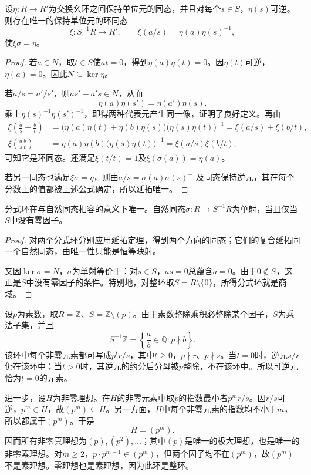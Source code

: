 \begin{theorem}\label{p2:localization-universal}
设$\eta:R\to R'$为交换幺环之间保持单位元的同态，并且对每个$s\in S$，$\eta(s)$可逆。则存在唯一的保持单位元的环同态
\[
\xi:S^{-1}R\to R',\qquad
\xi(a/s)=\eta(a)\eta(s)^{-1},
\]
使$\xi\sigma=\eta$。
\end{theorem}
\begin{proof}
若$a\in N$，取$t\in S$使$at=0$，得到$\eta(a)\eta(t)=0$。因$\eta(t)$可逆，$\eta(a)=0$。因此$N\subseteq\ker\eta$。

若$a/s=a'/s'$，则$as'-a's\in N$，从而
\[
\eta(a)\eta(s')=\eta(a')\eta(s).
\]
乘上$\eta(s)^{-1}\eta(s')^{-1}$，即得两种代表元产生同一像，证明了良好定义。再由
\begin{align*}
\xi\left(\frac as+\frac bt\right)
&=\bigl(\eta(a)\eta(t)+\eta(b)\eta(s)\bigr)
  \bigl(\eta(s)\eta(t)\bigr)^{-1}
=\xi(a/s)+\xi(b/t),\\
\xi\left(\frac as\frac bt\right)
&=\eta(a)\eta(b)\bigl(\eta(s)\eta(t)\bigr)^{-1}
=\xi(a/s)\xi(b/t),
\end{align*}
可知它是环同态。还满足$\xi(t/t)=1$及$\xi(\sigma(a))=\eta(a)$。

若另一同态也满足$\xi\sigma=\eta$，则由$a/s=\sigma(a)\sigma(s)^{-1}$及同态保持逆元，其在每个分数上的值都被上述公式确定，所以延拓唯一。
\end{proof}

\begin{corollary}
分式环在与自然同态相容的意义下唯一。自然同态$\sigma:R\to S^{-1}R$为单射，当且仅当$S$中没有零因子。
\end{corollary}
\begin{proof}
对两个分式环分别应用延拓定理，得到两个方向的同态；它们的复合延拓同一个自然同态，由唯一性只能是恒等映射。

又因$\ker\sigma=N$，$\sigma$为单射等价于：对$s\in S$，$as=0$总蕴含$a=0$。由于$0\notin S$，这正是$S$中没有零因子的条件。特别地，对整环取$S=R\setminus\{0\}$，所得分式环就是商域。
\end{proof}

\begin{example}
设$p$为素数，取$R=\mathbb Z$、$S=\mathbb Z\setminus(p)$。由于素数整除乘积必整除某个因子，$S$为乘法子集，并且
\[
S^{-1}\mathbb Z
=\left\{\frac ab\in\mathbb Q:p\nmid b\right\}.
\]
该环中每个非零元素都可写成$p^t r/s$，其中$t\ge0$，$p\nmid r$、$p\nmid s$。当$t=0$时，逆元$s/r$仍在该环中；当$t>0$时，其逆元的约分后分母被$p$整除，不在该环中。所以可逆元恰为$t=0$的元素。

进一步，设$H$为非零理想。在$H$的非零元素中取$p$的指数最小者$p^m r/s$。因$r/s$可逆，$p^m\in H$，故$(p^m)\subseteq H$。另一方面，$H$中每个非零元素的指数均不小于$m$，所以都属于$(p^m)$。于是
\[
H=(p^m).
\]
因而所有非零真理想为$(p),(p^2),\ldots$；其中$(p)$是唯一的极大理想，也是唯一的非零素理想。对$m\ge2$，$p\cdot p^{m-1}\in(p^m)$，但两个因子均不在$(p^m)$，故$(p^m)$不是素理想。零理想也是素理想，因为此环是整环。
\end{example}
